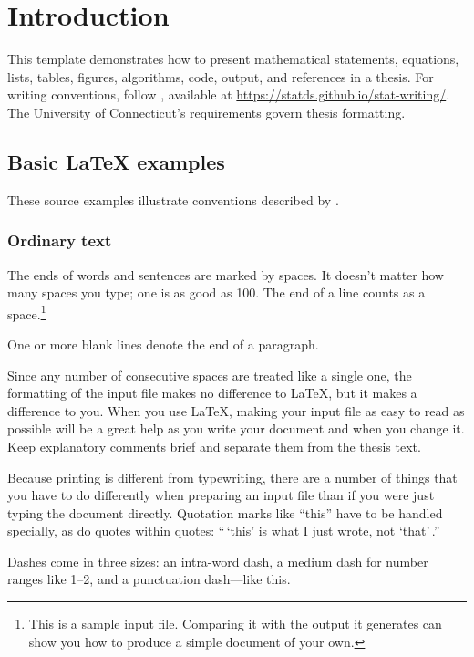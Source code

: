 \chapter{Introduction}
\label{introduction}


This template demonstrates how to present mathematical statements, equations,
lists, tables, figures, algorithms, code, output, and references in a thesis.
For writing conventions, follow \citet{schifano2026statistical}, available at
\url{https://statds.github.io/stat-writing/}. The University of Connecticut's
requirements govern thesis formatting.


\section{Basic LaTeX examples}
These source examples illustrate conventions described by
\citet{lamport1994latex}.


\subsection{Ordinary text}


The ends of words and sentences are marked by spaces. It doesn't matter how
many spaces you type; one is as good as 100. The end of a line counts as a
space.\footnote{ This is a sample input file. Comparing it with the output it
generates can show you how to produce a simple document of your own. }


One or more blank lines denote the end of a paragraph.


Since any number of consecutive spaces are treated like a single one, the
formatting of the input file makes no difference to \LaTeX, but it makes a
difference to you. When you use \LaTeX, making your input file as easy to read
as possible will be a great help as you write your document and when you change
it. Keep explanatory comments brief and separate them from the thesis text.


Because printing is different from typewriting, there are a number of things
that you have to do differently when preparing an input file than if you were
just typing the document directly. Quotation marks like ``this'' have to be
handled specially, as do quotes within quotes: ``\,`this' is what I just wrote,
not `that'\,.''


Dashes come in three sizes: an intra-word dash, a medium dash for number ranges
like 1--2, and a punctuation dash---like this.


